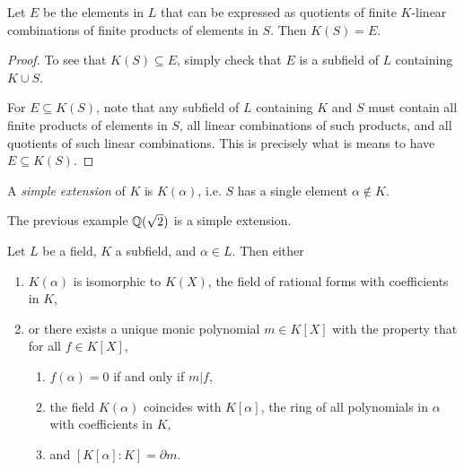 \begin{theorem}
  Let $E$ be the elements in $L$ that can be expressed
  as quotients of finite $K$-linear combinations of
  finite products of elements in $S$. Then $K(S) = E$.
\end{theorem}

\begin{proof}
  To see that $K(S) \subseteq E$, simply check that $E$
  is a subfield of $L$ containing $K \cup S$.

  For $E \subseteq K(S)$, note that any subfield of $L$
  containing $K$ and $S$ must contain all finite products
  of elements in $S$, all linear combinations of
  such products, and all quotients of such linear
  combinations. This is precisely what is means
  to have $E \subseteq K(S)$.
\end{proof}

\begin{definition}
  A \emph{simple extension} of $K$ is $K(\alpha)$,
  i.e. $S$ has a single element $\alpha \notin K$.
\end{definition}

\begin{example}
  The previous example $\mathbb{Q}(\sqrt{2})$ is a simple
  extension.
\end{example}

\begin{theorem}
  Let $L$ be a field, $K$ a subfield, and $\alpha \in L$.
  Then either
  \begin{enumerate}
    \item $K(\alpha)$ is isomorphic to $K(X)$, the
      field of rational forms with coefficients in $K$,
    \item or there exists a unique monic polynomial
      $m \in K[X]$ with the property that for all
      $f \in K[X]$,
      \begin{enumerate}
        \item $f(\alpha) = 0$ if and only if $m | f$,
        \item the field $K(\alpha)$ coincides with
          $K[\alpha]$, the ring of all polynomials
          in $\alpha$ with coefficients in $K$,
        \item and $[K[\alpha] : K] = \partial m$.
      \end{enumerate}
  \end{enumerate}
\end{theorem}

